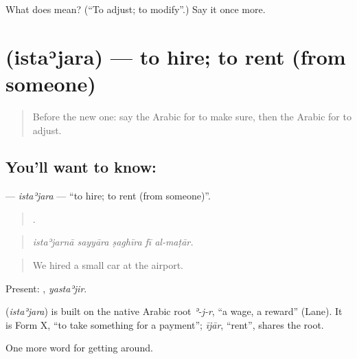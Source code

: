 \begin{tcolorbox}[breakable,colback=teal!4,colframe=teal!35!black,title={Before you move on}]
What does  mean? (\textquotedblleft{}To adjust; to modify\textquotedblright{}.) Say it once more.
\end{tcolorbox}
\section[\texorpdfstring{\ar{استأجر} (istaʾjara)}{استأجر (istaʾjara)}]{ (istaʾjara) — to hire; to rent (from someone)}

\label{lesson:AR-C427-istajara}



\begin{quote}
Before the new one: say the Arabic for to make sure, then the Arabic for to adjust.
\end{quote}

\subsection*{You'll want to know: }
\textbf{} — \emph{istaʾjara} — \textquotedblleft{}to hire; to rent (from someone)\textquotedblright{}.

\begin{quote}
    .
\end{quote}

\begin{quote}
\emph{istaʾjarnā sayyāra ṣaghīra fī al-maṭār.}
\end{quote}

\begin{quote}
We hired a small car at the airport.
\end{quote}

Present: , \emph{yastaʾjir}.

\begin{cousinweb}
\textbf{} (\emph{istaʾjara}) is built on the native Arabic root \emph{ʾ-j-r}, \textquotedblleft{}a wage, a reward\textquotedblright{} (Lane). It is Form X, \textquotedblleft{}to take something for a payment\textquotedblright{}; \emph{ījār}, \textquotedblleft{}rent\textquotedblright{}, shares the root.
\end{cousinweb}

\begin{grammarlens}[title={What you've built}]
One more word for getting around.
\end{grammarlens}


